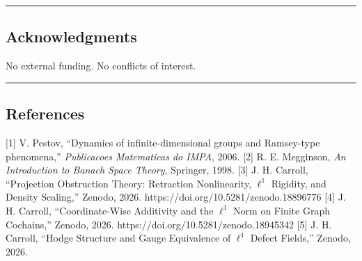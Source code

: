 \documentclass[
]{article}
\begin{document}
\begin{center}\rule{0.5\linewidth}{0.5pt}\end{center}

\subsection{Acknowledgments}\label{acknowledgments}

No external funding. No conflicts of interest.

\begin{center}\rule{0.5\linewidth}{0.5pt}\end{center}

\subsection{References}\label{references}

{[}1{]} V. Pestov, ``Dynamics of infinite-dimensional groups and
Ramsey-type phenomena,'' \emph{Publicacoes Matematicas do IMPA}, 2006.
{[}2{]} R. E. Megginson, \emph{An Introduction to Banach Space Theory},
Springer, 1998. {[}3{]} J. H. Carroll, ``Projection Obstruction Theory:
Retraction Nonlinearity, \(\ell^1\) Rigidity, and Density Scaling,''
Zenodo, 2026. https://doi.org/10.5281/zenodo.18896776 {[}4{]} J. H.
Carroll, ``Coordinate-Wise Additivity and the \(\ell^1\) Norm on Finite
Graph Cochains,'' Zenodo, 2026. https://doi.org/10.5281/zenodo.18945342
{[}5{]} J. H. Carroll, ``Hodge Structure and Gauge Equivalence of
\(\ell^1\) Defect Fields,'' Zenodo, 2026.
\end{document}
